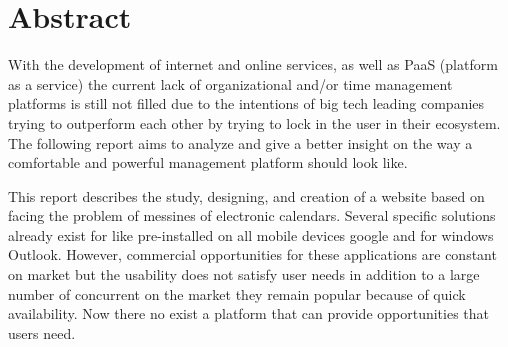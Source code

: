 \section{Abstract}
\par
With the development of internet and online services, as well as PaaS (platform as a service) the current lack of organizational and/or time management platforms is still not filled due to the intentions of big tech leading companies trying to outperform each other by trying to lock in the user in their ecosystem. The following report aims to analyze and give a better insight on the way a comfortable and powerful management platform should look like. 
\par This report describes the study, designing, and creation of a website based on facing the problem of messines of electronic calendars. Several specific solutions already exist for like pre-installed on all mobile devices google and for windows Outlook. However, commercial opportunities for
these applications are constant on market but the usability does not satisfy user needs in addition to a large number of concurrent on the market they remain popular because of quick availability. Now there no exist a platform that can provide opportunities that users need.